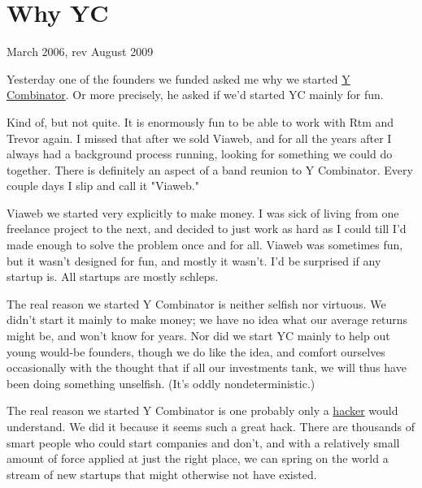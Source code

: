 \chapter{Why YC}


            
              
                

March 2006, rev August 2009

Yesterday one of the
                  founders we funded asked me why we started
                  \href{http://ycombinator.com}{Y Combinator}. Or more
                  precisely, he asked if we'd started YC mainly for fun.

Kind
                  of, but not quite. It is enormously fun to be able to work
                  with Rtm and Trevor again. I missed that after we sold Viaweb,
                  and for all the years after I always had a background process
                  running, looking for something we could do together. There is
                  definitely an aspect of a band reunion to Y Combinator. Every
                  couple days I slip and call it "Viaweb."

Viaweb we
                  started very explicitly to make money. I was sick of living
                  from one freelance project to the next, and decided to just
                  work as hard as I could till I'd made enough to solve the
                  problem once and for all. Viaweb was sometimes fun, but it
                  wasn't designed for fun, and mostly it wasn't. I'd be
                  surprised if any startup is. All startups are mostly
                  schleps.

The real reason we started Y Combinator is
                  neither selfish nor virtuous. We didn't start it mainly to
                  make money; we have no idea what our average returns might be,
                  and won't know for years. Nor did we start YC mainly to help
                  out young would-be founders, though we do like the idea, and
                  comfort ourselves occasionally with the thought that if all
                  our investments tank, we will thus have been doing something
                  unselfish. (It's oddly nondeterministic.)

The real
                  reason we started Y Combinator is one probably only a
                  \href{http://www.paulgraham.com/gba.html}{hacker} would understand. We did it
                  because it seems such a great hack. There are thousands of
                  smart people who could start companies and don't, and with a
                  relatively small amount of force applied at just the right
                  place, we can spring on the world a stream of new startups
                  that might otherwise not have existed.

